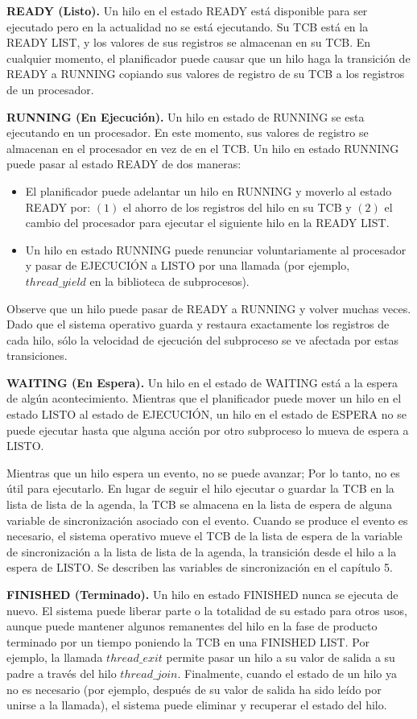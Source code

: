 \documentclass[10pt]{book}
\begin{document}
\textbf{READY (Listo).} Un hilo en el estado READY está disponible para ser ejecutado pero en la actualidad no se está ejecutando. Su TCB está en la READY LIST, y los valores de sus registros se almacenan en su TCB. En cualquier momento, el planificador puede causar que un hilo haga la transición de READY a RUNNING copiando sus valores de registro de su TCB a los registros de un procesador.

\textbf{RUNNING (En Ejecución).} Un hilo en estado de RUNNING se esta ejecutando en un procesador. En este momento, sus valores de registro se almacenan en el procesador en vez de en el TCB. Un hilo en estado RUNNING puede pasar al estado READY de dos maneras:
\begin{itemize}
\item El planificador puede adelantar un hilo en RUNNING y moverlo al estado READY por: $(1)$ el ahorro de los registros del hilo en su TCB y $(2)$ el cambio del procesador para ejecutar el siguiente hilo en la READY LIST.
\item Un hilo en estado RUNNING puede renunciar voluntariamente al procesador y pasar de EJECUCIÓN a LISTO por una llamada (por ejemplo, $thread\_ yield$ en la biblioteca de subprocesos).
\end{itemize}

Observe que un hilo puede pasar de READY a RUNNING y volver muchas veces. Dado que el sistema operativo guarda y restaura exactamente los registros de cada hilo, sólo la velocidad de ejecución del subproceso se ve afectada por estas transiciones.

\textbf{WAITING (En Espera).} Un hilo en el estado de WAITING está a la espera de algún acontecimiento. Mientras que el planificador puede mover un hilo en el estado LISTO al estado de EJECUCIÓN, un hilo en el estado de ESPERA no se puede ejecutar hasta que alguna acción por otro subproceso lo mueva de espera a LISTO.

Mientras que un hilo espera un evento, no se puede avanzar; Por lo tanto, no es útil para ejecutarlo. En lugar de seguir el hilo ejecutar o guardar la TCB en la lista de lista de la agenda, la TCB se almacena en la lista de espera de alguna variable de sincronización asociado con el evento. Cuando se produce el evento es necesario, el sistema operativo mueve el TCB de la lista de espera de la variable de sincronización a la lista de lista de la agenda, la transición desde el hilo a la espera de LISTO. Se describen las variables de sincronización en el capítulo 5.

\textbf{FINISHED (Terminado).} Un hilo en estado FINISHED nunca se ejecuta de nuevo. El sistema puede liberar parte o la totalidad de su estado para otros usos, aunque puede mantener algunos remanentes del hilo en la fase de producto terminado por un tiempo poniendo la TCB en una FINISHED LIST. Por ejemplo, la llamada $thread\_ exit$ permite pasar un hilo a su valor de salida a su padre a través del hilo $thread\_ join$. Finalmente, cuando el estado de un hilo ya no es necesario (por ejemplo, después de su valor de salida ha sido leído por unirse a la llamada), el sistema puede eliminar y recuperar el estado del hilo.
\end{document}
